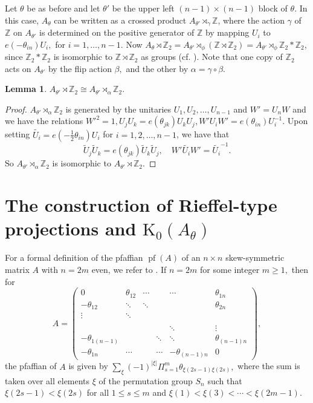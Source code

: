 \documentclass[9pt, BCOR=2mm]{amsart}
\numberwithin{equation}{section}
\numberwithin{equation}{section}
\newtheorem{lemma}[theorem]{Lemma}
\newcommand{\Z}{{\mathbb{Z}}}
\newcommand{\pf}{{\operatorname{pf}}}
\newcommand{\K}{\mathrm{K}} %
\begin{document}
 Let  $\theta$ be as before and let $\theta'$ be  the  upper left $(n-1) \times (n-1)$ block of $\theta$. In this case, $A_{\theta}$ can be written as a crossed product $ A_{\theta'}\rtimes_{\gamma} \Z$, where the action $\gamma$  of $\Z$ on $A_{\theta'}$ is determined on the positive generator of $\Z$ by mapping
$ U_i$ to $e(-\theta_{in})U_i,$ for $i =1, \ldots, n-1.$  Now $A_{\theta}\rtimes \Z_2 = A_{\theta'}\rtimes_\phi (\Z \rtimes \Z_2) = A_{\theta'}\rtimes_\phi \Z_2 *  \Z_2$, since $\Z_2 *  \Z_2$ is isomorphic to $\Z \rtimes \Z_2$ as groups (cf. \cite[Proposition 6]{FW93}). Note that one copy of $\Z_2$ acts on $A_{\theta'}$ by the flip action $\beta,$ and the other by $\alpha = \gamma \circ \beta$.
 
 
 \begin{lemma}\label{lemma:flip=flip}
 	$A_{\theta'}\rtimes \Z_2 \cong A_{\theta'}\rtimes_\alpha \Z_2.$
 \end{lemma}
 \begin{proof}
 	$A_{\theta'}\rtimes_\alpha \Z_2$ is generated by the unitaries $U_1, U_2, \ldots, U_{n-1}$ and $W'=U_nW$ and  we have the relations $W'^2 = 1,  U_jU_k = e(\theta_{jk})  U_kU_j, W'U_iW' = e(\theta_{in})U_i^{-1}.$ Upon setting $\tilde{U_i} = e(-\frac{1}{2}\theta_{in})U_i$ for $i=1,2,\ldots,n-1$, we have that $$\tilde{U}_j\tilde{U}_k = e(\theta_{jk})\tilde{U}_k\tilde{U}_j,\quad  W'\tilde{U_i}W' = \tilde{U_i}^{-1}.$$ So $A_{\theta'}\rtimes_\alpha \Z_2$ is isomorphic to $A_{\theta'}\rtimes \Z_2.$
 \end{proof}
 
 
 
 \section{The construction of Rieffel-type projections and $\K_0(A_\theta)$}\label{sec:rie}
 
For a formal definition of the pfaffian $\pf(A)$ of an $n \times n$ skew-symmetric matrix $A$ with $n=2m$ even, we refer to \cite[Definition 3.1]{Cha20}. If $n=2m$ for some integer $m\geq1,$ then for
$$A=\left(\begin{matrix}
                  0 & \theta_{12}&\cdots&&\cdots&\theta_{1n} \\
                  -\theta_{12} &\ddots&\ddots&&& \theta_{2n}\\
                  \vdots&\ddots&&&&\\
                  &&&&&\\
                  &&&&\ddots&\vdots\\
                  -\theta_{1(n-1)}&&&\ddots&\ddots& \theta_{(n-1)n}\\
                  -\theta_{1n} &\cdots&&\cdots& -\theta_{(n-1)n}&0
                \end{matrix}
\right),$$
the pfaffian of $A$ is given by $\sum_{\xi}(-1)^{|\xi|}\Pi_{s=1}^m \theta_{\xi(2s-1)\xi(2s)},$ where the sum is taken over all elements $\xi$ of the
permutation group $S_n$ such that
$\xi(2s-1)<\xi(2s)$ for all $1\leq s\leq m$ and $\xi(1)<\xi(3)<\cdots<\xi(2m-1).$
\end{document}
